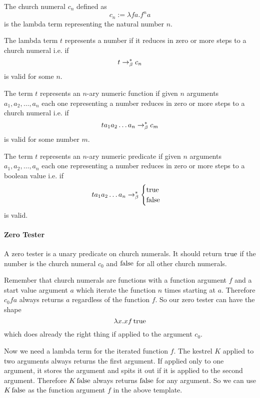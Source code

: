 \begin{definition}
  The church numeral $c_n$ defined as
  $$ c_n := \lambda f a. f^n a$$
  is the lambda term representing the natural number $n$.
\end{definition}

\begin{definition}
  The lambda term $t$ represents a number if it reduces in zero or more steps
  to a church numeral i.e. if $$t \to^*_\beta c_n$$ is valid for some $n$.
\end{definition}

\begin{definition}
  The term $t$ represents an $n$-ary numeric function if given $n$ arguments
  $a_1, a_2, \ldots, a_n$ each one representing a number reduces in zero or
  more steps to a church numeral i.e. if $$t a_1 a_2 \ldots a_n \to^*_\beta
  c_m$$ is valid for some number $m$.
\end{definition}


\begin{definition}
  The term $t$ represents an $n$-ary numeric predicate if given $n$ arguments
  $a_1, a_2, \ldots, a_n$ each one representing a number reduces in zero or
  more steps to a boolean value i.e. if
  $$t a_1 a_2 \ldots a_n \to^*_\beta
  \begin{cases} \text{true} \\ \text{false}
  \end{cases}
  $$ is valid.
\end{definition}


\paragraph{Zero Tester}

A zero tester is a unary predicate on church numerals. It should return
$\text{true}$ if the number is the church numeral $c_0$ and $\text{false}$ for all other
church numerals.

Remember that church numerals are functions with a function argument $f$ and a
start value argument $a$ which iterate the function $n$ times starting at
$a$. Therefore $c_0 f a$ always returns $a$ regardless of the function $f$. So
our zero tester can have the shape $$\lambda x. x f\, \text{true}$$ which does already
the right thing if applied to the argument $c_0$.

Now we need a lambda term for the iterated function $f$. The kestrel $K$
applied to two arguments always returns the first argument. If applied only to
one argument, it stores the argument and spits it out if it is applied to the
second argument. Therefore $K\,\text{false}$ always returns $\text{false}$ for any
argument. So we can use $K\,\text{false}$ as the function argument $f$ in the above
template.


